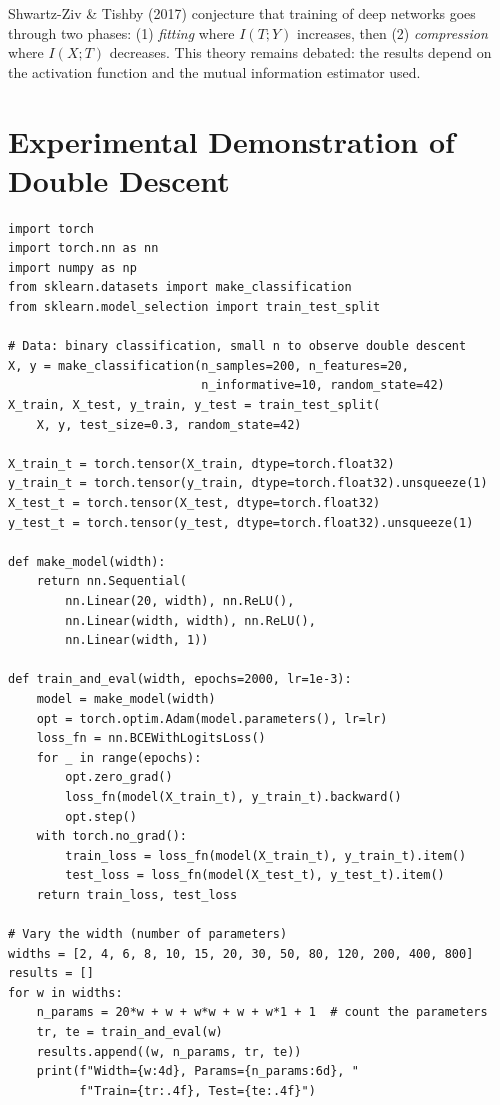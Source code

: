 \begin{remark}
Shwartz-Ziv \& Tishby (2017) conjecture that training of deep
networks goes through two phases: (1) \emph{fitting} where $I(T;Y)$ increases,
then (2) \emph{compression} where $I(X;T)$ decreases. This theory remains
debated: the results depend on the activation function and
the mutual information estimator used.
\end{remark}

\section{Experimental Demonstration of Double Descent}
\label{sec:double-descent-exp}

\begin{codeblock}[title=\textbf{Experimental double descent with variable-width networks}]
\begin{verbatim}
import torch
import torch.nn as nn
import numpy as np
from sklearn.datasets import make_classification
from sklearn.model_selection import train_test_split

# Data: binary classification, small n to observe double descent
X, y = make_classification(n_samples=200, n_features=20,
                           n_informative=10, random_state=42)
X_train, X_test, y_train, y_test = train_test_split(
    X, y, test_size=0.3, random_state=42)

X_train_t = torch.tensor(X_train, dtype=torch.float32)
y_train_t = torch.tensor(y_train, dtype=torch.float32).unsqueeze(1)
X_test_t = torch.tensor(X_test, dtype=torch.float32)
y_test_t = torch.tensor(y_test, dtype=torch.float32).unsqueeze(1)

def make_model(width):
    return nn.Sequential(
        nn.Linear(20, width), nn.ReLU(),
        nn.Linear(width, width), nn.ReLU(),
        nn.Linear(width, 1))

def train_and_eval(width, epochs=2000, lr=1e-3):
    model = make_model(width)
    opt = torch.optim.Adam(model.parameters(), lr=lr)
    loss_fn = nn.BCEWithLogitsLoss()
    for _ in range(epochs):
        opt.zero_grad()
        loss_fn(model(X_train_t), y_train_t).backward()
        opt.step()
    with torch.no_grad():
        train_loss = loss_fn(model(X_train_t), y_train_t).item()
        test_loss = loss_fn(model(X_test_t), y_test_t).item()
    return train_loss, test_loss

# Vary the width (number of parameters)
widths = [2, 4, 6, 8, 10, 15, 20, 30, 50, 80, 120, 200, 400, 800]
results = []
for w in widths:
    n_params = 20*w + w + w*w + w + w*1 + 1  # count the parameters
    tr, te = train_and_eval(w)
    results.append((w, n_params, tr, te))
    print(f"Width={w:4d}, Params={n_params:6d}, "
          f"Train={tr:.4f}, Test={te:.4f}")
\end{verbatim}
\end{codeblock}

